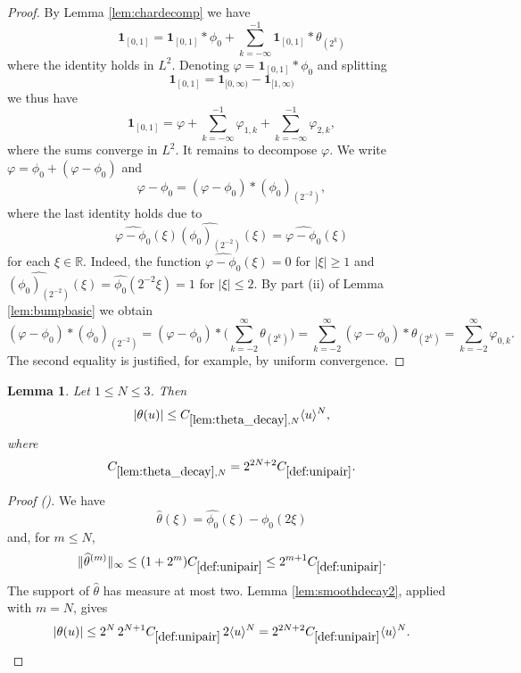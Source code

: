 \documentclass[12pt,reqno]{amsart}
\newcommand{\auto}{{({\tiny\faCar})}}
\theoremstyle{plain}
\newtheorem{lemma}[theorem]{Lemma}
\numberwithin{equation}{section}
\theoremstyle{remark}
\newcommand{\uses}[1]{}
\newcommand{\usesdefs}[1]{}
\newcommand{\R}{{\mathbb R}}
\begin{document}
\begin{proof}
By Lemma \ref{lem:chardecomp} we have
\begin{equation}
    \label{eq:L2char}
    \mathbf{1}_{[0,1]} =\mathbf{1}_{[0,1]}\ast\phi_0  +  \sum_{k=-\infty}^{-1} \mathbf{1}_{[0,1]}\ast  \theta_{(2^k)}
\end{equation}
where the identity holds in $L^2$.
Denoting $\varphi=\mathbf{1}_{[0,1]}\ast\phi_0$ and splitting
\[\mathbf{1}_{[0,1]} = \mathbf{1}_{[0,\infty)} - \mathbf{1}_{[1,\infty)}\]
 we  thus have
\[\mathbf{1}_{[0,1]} = \varphi +  \sum_{k=-\infty}^{-1} \varphi_{1,k}+ \sum_{k=-\infty}^{-1}\varphi_{2,k},\]
where the sums converge in $L^2$.
It remains to decompose $\varphi$.
We  write $\varphi= \phi_0 + (\varphi-\phi_0)$
and
\[
\varphi-\phi_0 = (\varphi - \phi_0)*(\phi_0)_{(2^{-2})},\]
where the last identity holds due to
\[\widehat{\varphi-\phi_0}(\xi) \widehat{(\phi_0)_{(2^{-2})}}(\xi) = \widehat{\varphi-\phi_0}(\xi) \]
for each $\xi\in \R$. Indeed, the function $\widehat{\varphi-\phi_0}(\xi)=0$ for $|\xi|\ge 1$ and $\widehat{(\phi_0)_{(2^{-2})}}(\xi) = \widehat{\phi_0}(2^{-2}\xi) =1$ for $|\xi|\le 2$.
By part (ii) of Lemma \ref{lem:bumpbasic} we obtain
\[ (\varphi - \phi_0)*(\phi_0)_{(2^{-2})} =  (\varphi - \phi_0)*\Big( \sum_{k=-2}^\infty \theta_{(2^k)}\Big )  =  \sum_{k=-2}^\infty (\varphi - \phi_0)*\theta_{(2^k)} =   \sum_{k=-2}^\infty \varphi_{0,k}.
\]
The  second equality is justified, for example, by uniform convergence.
\end{proof}

\begin{lemma}\label{lem:theta_decay}\uses{lem:smoothdecay2}\usesdefs{bracket bump,def:cn-window,def:unipair,defn:window based bump functions}
Let $1\le N\le3$. Then
\begin{equation}\label{auto:theta-decay}
|\theta(u)|\le C_{\ref{lem:theta_decay},N}\langle u\rangle^N,
\end{equation}
where
\begin{equation}\label{auto:theta-decay-constant-definition}
C_{\ref{lem:theta_decay},N}=2^{2N+2}C_{\ref{def:unipair}}.
\end{equation}
\end{lemma}
\begin{proof}[Proof \auto]
We have
\[
\widehat\theta(\xi)=\widehat{\phi_0}(\xi)-\widehat{\phi_0}(2\xi)
\]
and, for $m\le N$,
\[
\|\widehat\theta^{(m)}\|_\infty
\le(1+2^m)C_{\ref{def:unipair}}\le2^{m+1}C_{\ref{def:unipair}}.
\]
The support of $\widehat\theta$ has measure at most two. Lemma \ref{lem:smoothdecay2}, applied with $m=N$, gives
\[
|\theta(u)|
\le2^N\,2^{N+1}C_{\ref{def:unipair}}\,2\langle u\rangle^N
=2^{2N+2}C_{\ref{def:unipair}}\langle u\rangle^N.
\]
\end{proof}
\end{document}
